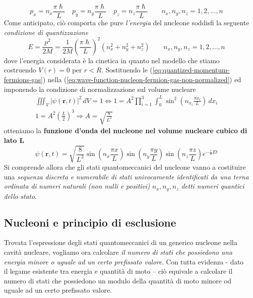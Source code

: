 \begin{equation}
	p_{x} = n_{x} \frac{\pi \hslash}{L} \quad
	p_{y} = n_{y} \frac{\pi \hslash}{L} \quad
	p_{z} = n_{z} \frac{\pi \hslash}{L} \qquad
	n_{x},n_{y},n_{z} = 1,2, \dots , n
	\label{eq:quantized-momentum-fermions-gas}
\end{equation}
Come anticipato, ciò comporta che pure \emph{l’energia} del nucleone soddisfi la seguente \emph{condizione di quantizzazione}
\begin{equation}
	E = \frac{p^{2}}{2 M} = \frac{1}{2 M} \left( \frac{\pi \hslash}{L} \right)^{2} (n_{x}^{2} + n_{y}^{2}+n_{z}^{2}) \qquad
	n_{x},n_{y},n_{z} = 1,2, \dots , n
	\label{eq:energy-nucleon-fermions-gas}
\end{equation}
dove l'energia considerata è la cinetica in quanto nel modello che stiamo costruendo $ V(r) = 0$ per $ r< R$.
Sostituendo le (\ref{eq:quantized-momentum-fermions-gas}) nella (\ref{eq:wave-function-nucleon-fermion-gas-non-normalized})
ed imponendo la condizione di normalizzazione sul volume nucleare
\begin{gather*}
    \iiint_{V} |\psi(\bm{r},t) |^{2} \, dV = 1 \iff
1 = A^{2} \prod_{i = 1}^{3} \int_{0}^{L} \sin ^{2}\left( n_{x_{i}} \frac{\pi x_{i}}{L} \right) \, dx_{i}\\
    1 = A^{2} \left( \frac{L}{2} \right)^{3} \Longrightarrow A = \sqrt{ \frac{8}{L^{3}} }
\end{gather*}
otteniamo la \textbf{funzione d’onda del nucleone nel volume nucleare cubico di lato L}
\begin{equation}
	\psi(\bm{r},t) = \sqrt{ \frac{8}{L^{3}}} \sin\left( n_{x} \frac{\pi x}{L} \right) \sin\left( n_{y} \frac{\pi y}{L} \right)
	\sin\left( n_{z} \frac{\pi z}{L} \right) e^{ -\frac{i}{\hslash}Et }
	\label{eq:wave-function-nucleon-fermion-gas-normalized}
\end{equation}
Si comprende allora che gli stati quantomeccanici del nucleone vanno a costituire una \emph{sequenza discreta e numerabile di stati univocamente identificati da una terna ordinata di numeri naturali (non nulli e positivi)} $n_x, n_y, n_z$  \emph{detti numeri quantici dello stato}.

\subsection{Nucleoni e principio di esclusione} \label{sec:nucleoni-principio-di-esclusione}

Trovata l’espressione degli stati quantomeccanici di un generico nucleone nella cavità nucleare, vogliamo ora calcolare \emph{il numero di stati che possiedono una energia minore o uguale ad un certo prefissato valore}.
Con tutta evidenza - dato il legame esistente tra energia e quantità di moto – ciò equivale a calcolare il numero di stati che possiedono un modulo della quantità di moto minore od uguale ad un certo prefissato valore.

